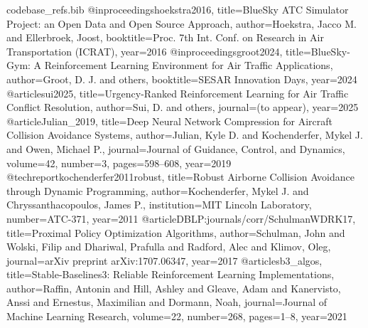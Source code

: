 %

\begin{filecontents}[overwrite]{codebase_refs.bib}
@inproceedings{hoekstra2016,
  title={{BlueSky} {ATC} Simulator Project: an Open Data and Open Source Approach},
  author={Hoekstra, Jacco M. and Ellerbroek, Joost},
  booktitle={Proc. 7th Int. Conf. on Research in Air Transportation (ICRAT)}, year={2016}}
@inproceedings{groot2024,
  title={{BlueSky-Gym}: A Reinforcement Learning Environment for Air Traffic Applications},
  author={Groot, D. J. and others}, booktitle={SESAR Innovation Days}, year={2024}}
@article{sui2025,
  title={Urgency-Ranked Reinforcement Learning for Air Traffic Conflict Resolution},
  author={Sui, D. and others}, journal={(to appear)}, year={2025}}
@article{Julian_2019,
  title={Deep Neural Network Compression for Aircraft Collision Avoidance Systems},
  author={Julian, Kyle D. and Kochenderfer, Mykel J. and Owen, Michael P.},
  journal={Journal of Guidance, Control, and Dynamics}, volume={42}, number={3},
  pages={598--608}, year={2019}}
@techreport{kochenderfer2011robust,
  title={Robust Airborne Collision Avoidance through Dynamic Programming},
  author={Kochenderfer, Mykel J. and Chryssanthacopoulos, James P.},
  institution={MIT Lincoln Laboratory}, number={ATC-371}, year={2011}}
@article{DBLP:journals/corr/SchulmanWDRK17,
  title={Proximal Policy Optimization Algorithms},
  author={Schulman, John and Wolski, Filip and Dhariwal, Prafulla and Radford, Alec and Klimov, Oleg},
  journal={arXiv preprint arXiv:1707.06347}, year={2017}}
@article{sb3_algos,
  title={Stable-Baselines3: Reliable Reinforcement Learning Implementations},
  author={Raffin, Antonin and Hill, Ashley and Gleave, Adam and Kanervisto, Anssi and
          Ernestus, Maximilian and Dormann, Noah},
  journal={Journal of Machine Learning Research}, volume={22}, number={268},
  pages={1--8}, year={2021}}
\end{filecontents}

